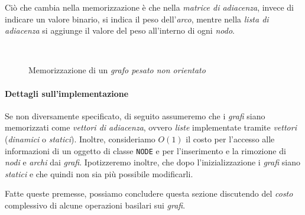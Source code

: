\noindent
Ciò che cambia nella memorizzazione è che nella \emph{matrice di adiacenza},
invece di indicare un valore binario, si indica il peso dell'\emph{arco}, mentre
nella \emph{lista di adiacenza} si aggiunge il valore del peso all'interno di
ogni \emph{nodo}.

\begin{figure}[h!]
    \centering
    \\
    \hfill
    \caption{Memorizzazione di un \emph{grafo pesato non orientato}}
\end{figure}

\paragraph{Dettagli sull'implementazione}
Se non diversamente specificato, di seguito assumeremo che i \emph{grafi} siano
memorizzati come \emph{vettori di adiacenza}, ovvero \emph{liste} implementate
tramite \emph{vettori} (\emph{dinamici} o \emph{statici}). Inoltre, consideriamo
$O(1)$ il costo per l'accesso alle informazioni di un oggetto di classe
\texttt{NODE} e per l'inserimento e la rimozione di \emph{nodi} e \emph{archi}
dai \emph{grafi}. Ipotizzeremo inoltre, che dopo l'inizializzazione i
\emph{grafi} siano \emph{statici} e che quindi non sia più possibile modificarli.

\bigskip\noindent
Fatte queste premesse, possiamo concludere questa sezione discutendo
del \emph{costo} complessivo di alcune operazioni basilari sui \emph{grafi}.

